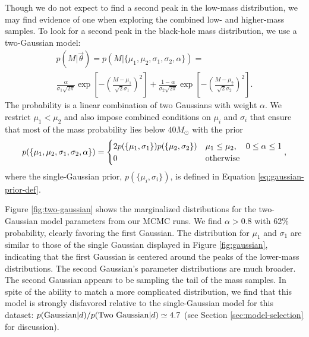\documentclass[preprint]{aastex}
\newcommand{\Msun}{M_\odot}
\newcommand{\vtheta}{\vec{\theta}}
\begin{document}
Though we do not expect to find a second peak in the low-mass
distribution, we may find evidence of one when exploring the combined
low- and higher-mass samples.  To look for a second peak in the
black-hole mass distribution, we use a two-Gaussian model:
\begin{multline}
  \label{eq:two-gaussian-def}
  p(M|\vtheta) = p(M|\{\mu_1, \mu_2, \sigma_1, \sigma_2, \alpha\}) = \\
  \frac{\alpha}{\sigma_1 \sqrt{2\pi}} \exp\left[ - \left( \frac{M -
        \mu_1}{\sqrt{2}\sigma_1} \right)^2 \right] + \frac{1-\alpha}{\sigma_2 \sqrt{2\pi}} \exp\left[ - \left( \frac{M -
        \mu_2}{\sqrt{2}\sigma_2} \right)^2 \right].
\end{multline}
The probability is a linear combination of two Gaussians with weight
$\alpha$.  We restrict $\mu_1 < \mu_2$ and also impose combined
conditions on $\mu_i$ and $\sigma_i$ that ensure that most of the mass
probability lies below $40 \Msun$ with the prior 
\begin{equation}
  p(\{\mu_1, \mu_2, \sigma_1, \sigma_2, \alpha\}) = 
  \begin{cases}
    2 p(\{\mu_1, \sigma_1\}) p(\{\mu_2, \sigma_2\}) & \mu_1 \leq
    \mu_2, \quad 0 \leq \alpha \leq 1 \\
    0 & \textnormal{otherwise}
  \end{cases},
\end{equation}
where the single-Gaussian prior, $p(\{\mu_i, \sigma_i\})$, is defined
in Equation \eqref{eq:gaussian-prior-def}.

Figure \ref{fig:two-gaussian} shows the marginalized distributions for
the two-Gaussian model parameters from our MCMC runs.  We find $\alpha
> 0.8$ with 62\% probability, clearly favoring the first Gaussian.
The distribution for $\mu_1$ and $\sigma_1$ are similar to those of
the single Gaussian displayed in Figure \ref{fig:gaussian}, indicating
that the first Gaussian is centered around the peaks of the lower-mass
distributions.  The second Gaussian's parameter distributions are much
broader.  The second Gaussian appears to be sampling the tail of the
mass samples.  In spite of the ability to match a more complicated
distribution, we find that this model is strongly disfavored relative
to the single-Gaussian model for this dataset:
$p(\textnormal{Gaussian}|d) / p(\textnormal{Two Gaussian}|d) \simeq
4.7$ (see Section \ref{sec:model-selection} for discussion).
\end{document}

